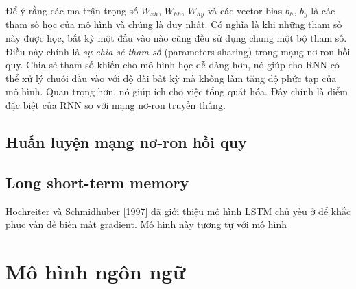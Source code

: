 Để ý rằng các ma trận trọng số $W_{xh}$, $W_{hh}$, $W_{hy}$ và các vector bias $b_h$, $b_y$ là các tham số học của mô hình và chúng là duy nhất. Có nghĩa là khi những tham số này được học, bất kỳ một đầu vào nào cũng đều sử dụng chung một bộ tham số. Điều này chính là \textit{sự chia sẻ tham số} (parameters sharing) trong mạng nơ-ron hồi quy. Chia sẻ tham số khiến cho mô hình học dễ dàng hơn, nó giúp cho RNN có thể xử lý chuỗi đầu vào với độ dài bất kỳ mà không làm tăng độ phức tạp của mô hình. Quan trọng hơn, nó giúp ích cho việc tổng quát hóa. Đây chính là điểm đặc biệt của RNN so với mạng nơ-ron truyền thẳng.



\subsection{Huấn luyện mạng nơ-ron hồi quy}



\subsection{Long short-term memory}

Hochreiter và Schmidhuber [1997] đã giới thiệu mô hình LSTM chủ yếu ở để khắc phục vấn đề biến mất gradient. Mô hình này tương tự với mô hình 

\section{Mô hình ngôn ngữ}


